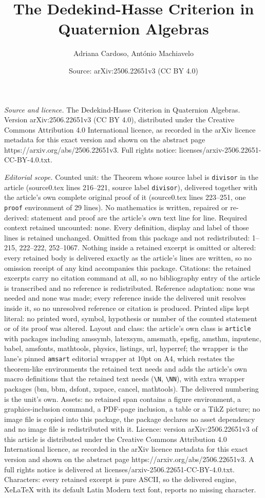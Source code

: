 \documentclass[10pt,a4paper]{amsart}
\title[The Dedekind-Hasse Criterion in Quaternion Algebras]{The Dedekind-Hasse Criterion in Quaternion Algebras}
\author{Adriana Cardoso, Ant\'onio Machiavelo}
\date{Source: arXiv:2506.22651v3 (CC BY 4.0)}
\begin{document}
\maketitle

\noindent\emph{Source and licence.} The Dedekind-Hasse Criterion in Quaternion Algebras. Version arXiv:2506.22651v3 (CC BY 4.0), distributed under the Creative Commons Attribution 4.0 International licence, as recorded in the arXiv licence metadata for this exact version and shown on the abstract page https://arxiv.org/abs/2506.22651v3. Full rights notice: licenses/arxiv-2506.22651-CC-BY-4.0.txt.\par\smallskip

\noindent\textit{Editorial scope.} Counted unit: the Theorem whose source label is \texttt{divisor} in the article (source0.tex lines 216--221, source label \texttt{divisor}), delivered together with the article's own complete original proof of it (source0.tex lines 223--251, one \texttt{proof} environment of 29 lines). No mathematics is written, repaired or re-derived: statement and proof are the article's own text line for line. Required context retained uncounted: none. Every definition, display and label of those lines is retained unchanged. Omitted from this package and not redistributed: 1--215, 222--222, 252--1067. Nothing inside a retained excerpt is omitted or altered: every retained body is delivered exactly as the article's lines are written, so no omission receipt of any kind accompanies this package. Citations: the retained excerpts carry no citation command at all, so no bibliography entry of the article is transcribed and no reference is redistributed. Reference adaptation: none was needed and none was made; every reference inside the delivered unit resolves inside it, so no unresolved reference or citation is produced. Printed slips kept literal: no printed word, symbol, hypothesis or number of the counted statement or of its proof was altered. Layout and class: the article's own class is \texttt{article} with packages including amssymb, latexsym, amsmath, epsfig, amsthm, inputenc, babel, amsfonts, mathtools, physics, listings, url, hyperref; the wrapper is the lane's pinned \texttt{amsart} editorial wrapper at 10pt on A4, which restates the theorem-like environments the retained text needs and adds the article's own macro definitions that the retained text needs (\texttt{\textbackslash N}, \texttt{\textbackslash NN}), with extra wrapper packages (bm, bbm, dsfont, xspace, cancel, mathtools). The delivered numbering is the unit's own. Assets: no retained span contains a figure environment, a graphics-inclusion command, a PDF-page inclusion, a table or a TikZ picture; no image file is copied into this package, the package declares no asset dependency and no image file is redistributed with it. Licence: version arXiv:2506.22651v3 of this article is distributed under the Creative Commons Attribution 4.0 International licence, as recorded in the arXiv licence metadata for this exact version and shown on the abstract page https://arxiv.org/abs/2506.22651v3. A full rights notice is delivered at licenses/arxiv-2506.22651-CC-BY-4.0.txt. Characters: every retained excerpt is pure ASCII, so the delivered engine, XeLaTeX with its default Latin Modern text font, reports no missing character.
\end{document}
